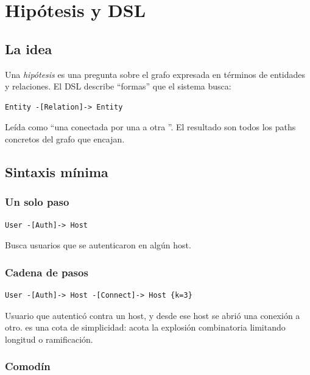 \chapter{Hipótesis y DSL}
\label{sec:man-dsl}

\section{La idea}

Una \emph{hipótesis} es una pregunta sobre el grafo expresada en
términos de entidades y relaciones. El DSL describe ``formas''
que el sistema busca:

\begin{lstlisting}[basicstyle=\ttfamily\small]
Entity -[Relation]-> Entity
\end{lstlisting}

Leída como ``una  conectada por una  a
otra ''. El resultado son todos los paths concretos
del grafo que encajan.

\section{Sintaxis mínima}

\subsection{Un solo paso}

\begin{lstlisting}[basicstyle=\ttfamily\small]
User -[Auth]-> Host
\end{lstlisting}

Busca usuarios que se autenticaron en algún host.

\subsection{Cadena de pasos}

\begin{lstlisting}[basicstyle=\ttfamily\small]
User -[Auth]-> Host -[Connect]-> Host {k=3}
\end{lstlisting}

Usuario que autenticó contra un host, y desde ese host se abrió
una conexión a otro.  es una cota de simplicidad: acota
la explosión combinatoria limitando longitud o ramificación.

\subsection{Comodín}

